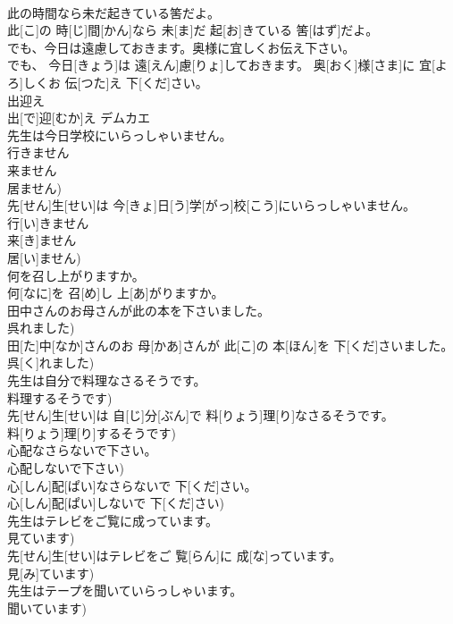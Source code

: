 \documentclass[8pt]{extreport}
\begin{document}
\begin{CJK}{UTF8}{min}
\\	此の時間なら未だ起きている筈だよ。	
\\	此[こ]の 時[じ]間[かん]なら 未[ま]だ 起[お]きている 筈[はず]だよ。
\\	でも、今日は遠慮しておきます。奥様に宜しくお伝え下さい。	
\\	でも、 今日[きょう]は 遠[えん]慮[りょ]しておきます。 奥[おく]様[さま]に 宜[よろ]しくお 伝[つた]え 下[くだ]さい。
\\	出迎え	
\\	出[で]迎[むか]え	デムカエ
\\	先生は今日学校にいらっしゃいません。 
\\	行きません 
\\	来ません 
\\	居ません)	
\\	先[せん]生[せい]は 今[きょ]日[う]学[がっ]校[こう]にいらっしゃいません。 
\\	行[い]きません 
\\	来[き]ません 
\\	居[い]ません)
\\	何を召し上がりますか。	
\\	何[なに]を 召[め]し 上[あ]がりますか。
\\	田中さんのお母さんが此の本を下さいました。 
\\	呉れました)	
\\	田[た]中[なか]さんのお 母[かあ]さんが 此[こ]の 本[ほん]を 下[くだ]さいました。 
\\	呉[く]れました)
\\	先生は自分で料理なさるそうです。 
\\	料理するそうです)	
\\	先[せん]生[せい]は 自[じ]分[ぶん]で 料[りょう]理[り]なさるそうです。 
\\	料[りょう]理[り]するそうです)
\\	心配なさらないで下さい。 
\\	心配しないで下さい)	
\\	心[しん]配[ぱい]なさらないで 下[くだ]さい。 
\\	心[しん]配[ぱい]しないで 下[くだ]さい)
\\	先生はテレビをご覧に成っています。 
\\	見ています)	
\\	先[せん]生[せい]はテレビをご 覧[らん]に 成[な]っています。 
\\	見[み]ています)
\\	先生はテープを聞いていらっしゃいます。 
\\	聞いています)	

\end{CJK}
\end{document}
